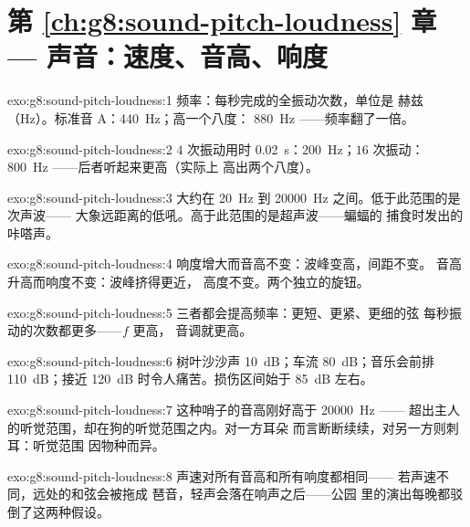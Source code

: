 \section*{第 \ref{ch:g8:sound-pitch-loudness} 章 --- 声音：速度、音高、响度}

\begin{solution}{exo:g8:sound-pitch-loudness:1}
频率：每秒完成的全振动次数，单位是
赫兹（\unit{Hz}）。标准音 A：\qty{440}{Hz}；高一个八度：
\qty{880}{Hz} ——频率翻了一倍。
\end{solution}

\begin{solution}{exo:g8:sound-pitch-loudness:2}
$4$ 次振动用时 \qty{0.02}{s}：\qty{200}{Hz}；$16$ 次振动：
\qty{800}{Hz} ——后者听起来更高（实际上
高出两个八度）。
\end{solution}

\begin{solution}{exo:g8:sound-pitch-loudness:3}
大约在 \qty{20}{Hz} 到 \qty{20000}{Hz} 之间。低于此范围的是次声波——
大象远距离的低吼。高于此范围的是超声波——蝙蝠的
捕食时发出的咔嗒声。
\end{solution}

\begin{solution}{exo:g8:sound-pitch-loudness:4}
响度增大而音高不变：波峰变高，间距不变。
音高升高而响度不变：波峰挤得更近，
高度不变。两个独立的旋钮。
\end{solution}

\begin{solution}{exo:g8:sound-pitch-loudness:5}
三者都会提高频率：更短、更紧、更细的弦
每秒振动的次数都更多——$f$ 更高，
音调就更高。
\end{solution}

\begin{solution}{exo:g8:sound-pitch-loudness:6}
树叶沙沙声 \qty{10}{dB}；车流 \qty{80}{dB}；音乐会前排
\qty{110}{dB}；接近 \qty{120}{dB} 时令人痛苦。损伤区间始于
\qty{85}{dB} 左右。
\end{solution}

\begin{solution}{exo:g8:sound-pitch-loudness:7}
这种哨子的音高刚好高于 \qty{20000}{Hz} ——
超出主人的听觉范围，却在狗的听觉范围之内。对一方耳朵
而言断断续续，对另一方则刺耳：听觉范围
因物种而异。
\end{solution}

\begin{solution}{exo:g8:sound-pitch-loudness:8}
声速对所有音高和所有响度都相同——
若声速不同，远处的和弦会被拖成
琶音，轻声会落在响声之后——公园
里的演出每晚都驳倒了这两种假设。
\end{solution}


